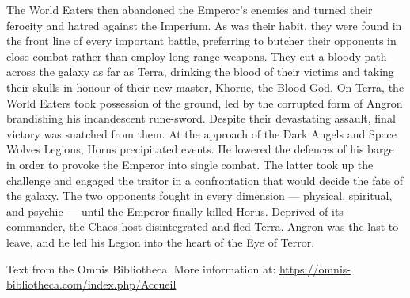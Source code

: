 The World Eaters then abandoned the Emperor's enemies and turned their ferocity and hatred against the Imperium. As was their habit, they were found in the front line of every important battle, preferring to butcher their opponents in close combat rather than employ long-range weapons. They cut a bloody path across the galaxy as far as Terra, drinking the blood of their victims and taking their skulls in honour of their new master, Khorne, the Blood God. On Terra, the World Eaters took possession of the ground, led by the corrupted form of Angron brandishing his incandescent rune-sword. Despite their devastating assault, final victory was snatched from them. At the approach of the Dark Angels and Space Wolves Legions, Horus precipitated events. He lowered the defences of his barge in order to provoke the Emperor into single combat. The latter took up the challenge and engaged the traitor in a confrontation that would decide the fate of the galaxy. The two opponents fought in every dimension --- physical, spiritual, and psychic --- until the Emperor finally killed Horus. Deprived of its commander, the Chaos host disintegrated and fled Terra. Angron was the last to leave, and he led his Legion into the heart of the Eye of Terror.

Text from the Omnis Bibliotheca. More information at: \url{https://omnis-bibliotheca.com/index.php/Accueil}
